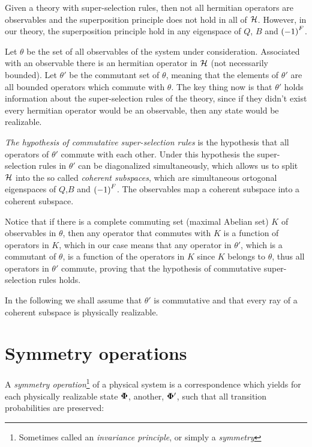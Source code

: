 \documentclass[oneside, 12pt, notitlepage]{book}
\begin{document}
Given a theory with super-selection rules, then not all hermitian operators are observables and the superposition principle does not hold in all of \(\mathcal{H}\). However, in our theory, the superposition principle hold in any eigenspace of \(Q\), \(B\) and \(\left(-1\right)^F\).\par

Let \(\theta\) be the set of all observables of the system under consideration. Associated with an observable there is an hermitian operator in \(\mathcal{H}\) (not necessarily bounded). Let \(\theta'\) be the commutant set of \(\theta\), meaning that the elements of \(\theta'\) are all bounded operators which commute with \(\theta\). The key thing now is that \(\theta'\) holds information about the super-selection rules of the theory, since if they didn't exist every hermitian operator would be an observable, then any state would be realizable.\par

\emph{The hypothesis of commutative super-selection rules} is the hypothesis that all operators of \(\theta'\) commute with each other. Under this hypothesis the super-selection rules in \(\theta'\) can be diagonalized simultaneously, which allows us to split \(\mathcal{H}\) into the so called \emph{coherent subspaces}, which are simultaneous ortogonal eigenspaces of \(Q\),\(B\) and \(\left(-1\right)^F\). The observables map a coherent subspace into a coherent subspace.\par

Notice that if there is a complete commuting set (maximal Abelian set) \(K\) of observables in \(\theta\), then any operator that commutes with \(K\) is a function of operators in \(K\), which in our case means that any operator in \(\theta'\), which is a commutant of \(\theta\), is a function of the operators in \(K\) since \(K\) belongs to \(\theta\), thus all operators in \(\theta'\) commute, proving that the hypothesis of commutative super-selection rules holds.\par

In the following we shall assume that \(\theta'\) is commutative and that every ray of a coherent subspace is physically realizable.\par

\section{Symmetry operations}

A \emph{symmetry operation}\footnote{Sometimes called an \emph{invariance principle}, or simply a \emph{symmetry}} of a physical system is a correspondence which yields for each physically realizable state \(\bm{\Phi}\), another, \(\bm{\Phi}'\), such that all transition probabilities are preserved:
\par
\end{document}
